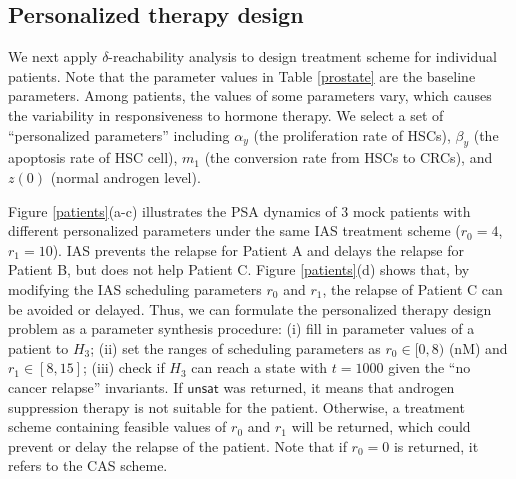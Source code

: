 
\subsection{Personalized therapy design}
We next apply $\delta$-reachability analysis to design treatment scheme for individual patients. Note that the parameter values in Table \ref{prostate} are the baseline parameters. Among patients, the values of some parameters vary, which causes the variability in responsiveness to hormone therapy. We select a set of ``personalized parameters'' including $\alpha_y$ (the proliferation rate of HSCs), $\beta_y$ (the apoptosis rate of HSC cell), $m_1$ (the conversion rate from HSCs to CRCs), and $z(0)$ (normal androgen level). 




Figure \ref{patients}(a-c) illustrates the PSA dynamics of $3$ mock patients with different personalized parameters under the same IAS treatment scheme ($r_0=4$, $r_1=10$). IAS prevents the relapse for Patient A and delays the relapse for Patient B, but does not help Patient C. Figure \ref{patients}(d) shows that, by modifying the IAS scheduling parameters $r_0$ and $r_1$, the relapse of Patient C can be avoided or delayed. Thus, we can formulate the personalized therapy design problem as a parameter synthesis procedure: (i) fill in parameter values of a patient to $H_3$; (ii) set the ranges of scheduling parameters as $r_0 \in [0,8)$ (nM) and $r_1 \in [8,15]$; (iii) check if $H_3$ can reach a state with $t=1000$ given the ``no cancer relapse'' invariants. If $\mathsf{unsat}$ was returned, it means that androgen suppression therapy is not suitable for the patient. Otherwise, a treatment scheme containing feasible values of $r_0$ and $r_1$ will be returned, which could prevent or delay the relapse of the patient. Note that if $r_0=0$ is returned, it refers to the CAS scheme.

